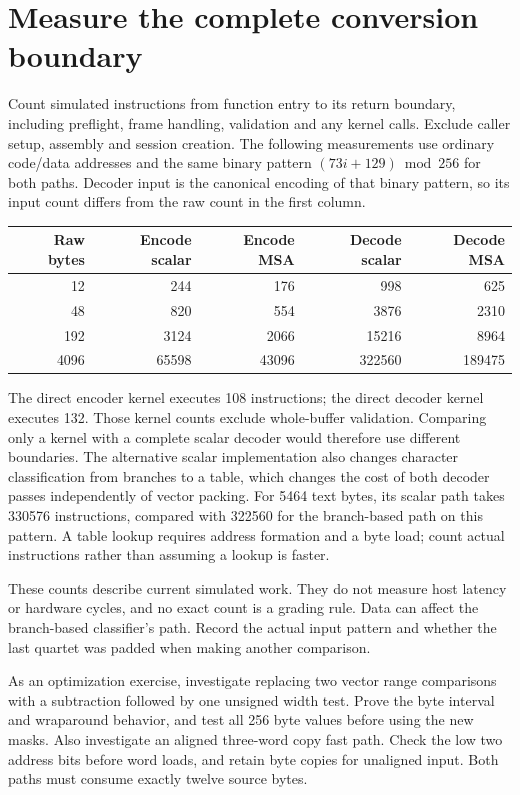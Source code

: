 \section{Measure the complete conversion boundary}
Count simulated instructions from function entry to its return boundary, including
preflight, frame handling, validation and any kernel calls. Exclude caller setup,
assembly and session creation. The following measurements use ordinary code/data addresses and the same binary pattern
\((73i+129)\bmod256\) for both paths. Decoder input is the canonical encoding of that
binary pattern, so its input count differs from the raw count in the first column.
\begin{center}
\begin{tabular}{rrrrr}
Raw bytes & Encode scalar & Encode MSA & Decode scalar & Decode MSA \\
\hline
12 & 244 & 176 & 998 & 625 \\
48 & 820 & 554 & 3876 & 2310 \\
192 & 3124 & 2066 & 15216 & 8964 \\
4096 & 65598 & 43096 & 322560 & 189475 \\
\end{tabular}
\end{center}

The direct encoder kernel executes 108 instructions; the direct decoder kernel executes
132. Those kernel counts exclude whole-buffer validation. Comparing only a kernel with
a complete scalar decoder would therefore use different boundaries. The alternative
scalar implementation also changes character classification from branches to a table,
which changes the cost of both decoder passes independently of vector packing.
For 5464 text bytes, its scalar path takes 330576 instructions, compared with 322560
for the branch-based path on this pattern. A table lookup requires address formation
and a byte load; count actual instructions rather than assuming a lookup is faster.

These counts describe current simulated work. They do not measure host latency or
hardware cycles, and no exact count is a grading rule. Data can affect the branch-based
classifier's path. Record the actual input pattern and whether the last quartet was
padded when making another comparison.

As an optimization exercise, investigate replacing two vector range comparisons with
a subtraction followed by one unsigned width test. Prove the byte interval and wraparound
behavior, and test all 256 byte values before using the new masks. Also investigate
an aligned three-word copy fast path. Check the low two address bits before word loads,
and retain byte copies for unaligned input. Both paths must consume exactly twelve
source bytes.
